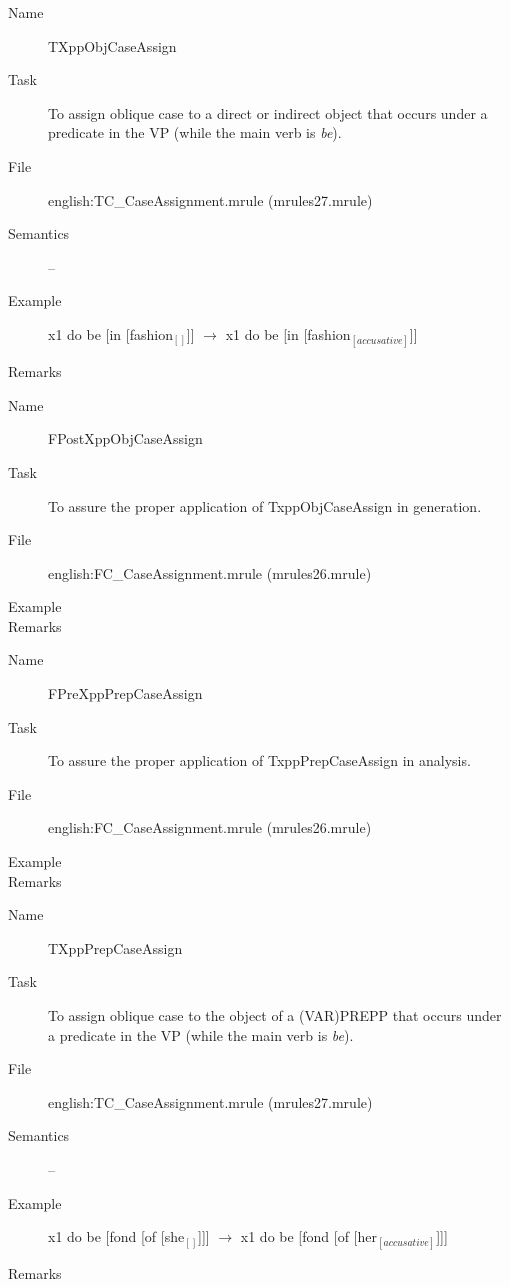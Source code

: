 \begin{description}
\vspace{1 cm}
\begin{description}
\item[Name] TXppObjCaseAssign
\item[Task] To assign oblique case to a direct or indirect object that occurs 
under a predicate in the VP (while the main verb is {\em be\/}).
\item[File] english:TC\_CaseAssignment.mrule (mrules27.mrule)
\item[Semantics] -- 
\item[Example] x1 do be [in [fashion$_{[]}$]] $\rightarrow$ 
x1 do be [in [fashion$_{[accusative]}$]]
\item[Remarks] 
\end{description}

\vspace{1 cm}
\begin{description}
\item[Name] FPostXppObjCaseAssign
\item[Task] To assure the proper application of TxppObjCaseAssign in 
generation.
\item[File] english:FC\_CaseAssignment.mrule (mrules26.mrule)
\item[Example] 
\item[Remarks]
\end{description}

\vspace{1 cm}
\begin{description}
\item[Name] FPreXppPrepCaseAssign
\item[Task] To assure the proper application of TxppPrepCaseAssign in analysis.
\item[File] english:FC\_CaseAssignment.mrule (mrules26.mrule)
\item[Example] 
\item[Remarks]
\end{description}

\vspace{1 cm}
\begin{description}
\item[Name] TXppPrepCaseAssign
\item[Task] To assign oblique case to the object of a (VAR)PREPP that occurs 
under a predicate in the VP (while the main verb is {\em be\/}).
\item[File] english:TC\_CaseAssignment.mrule (mrules27.mrule)
\item[Semantics] -- 
\item[Example] x1 do be [fond [of [she$_{[]}$]]] $\rightarrow$ 
x1 do be [fond [of [her$_{[accusative]}$]]]
\item[Remarks]
\end{description}


\end{description}
